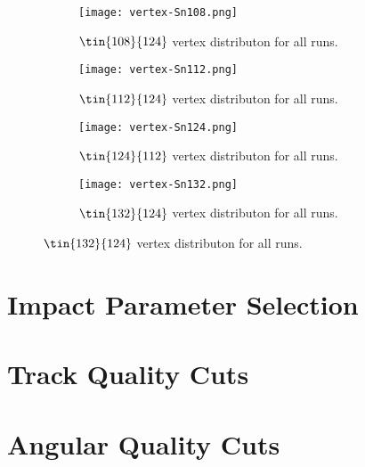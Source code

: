 \begin{figure}[!htb]
    \centering
    \begin{subfigure}[t]{\textwidth}
        \centering
        \texttt{[image: vertex-Sn108.png]} 
        \caption{$\tin{108}{124}$ vertex distributon for all runs.} \label{fig:vertex108}
    \end{subfigure}
    \hfill
    \begin{subfigure}[t]{\textwidth}
        \centering
        \texttt{[image: vertex-Sn112.png]} 
        \caption{$\tin{112}{124}$ vertex distributon for all runs.} \label{fig:vertex112}
    \end{subfigure}
    
    \begin{subfigure}[t]{\textwidth}
        \centering
        \texttt{[image: vertex-Sn124.png]} 
        \caption{$\tin{124}{112}$ vertex distributon for all runs.} \label{fig:vertex124}
    \end{subfigure}
    \hfill
    \begin{subfigure}[t]{\textwidth}
        \centering
        \texttt{[image: vertex-Sn132.png]} 
        \caption{$\tin{132}{124}$ vertex distributon for all runs.} \label{fig:vertex132}
    \end{subfigure}
\label{fig:vertexdist}
\end{figure}


\section{Impact Parameter Selection}


\section{Track Quality Cuts}



\section{Angular Quality Cuts}

